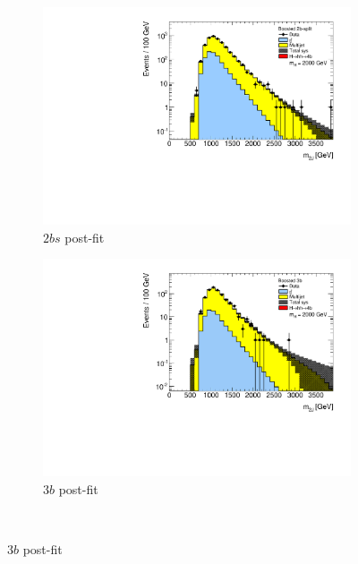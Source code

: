 \begin{figure}[htb!]
\centering
\captionsetup{justification=centering}
    \hspace{-2cm}
    \begin{subfigure}[b]{0.33\textwidth}
        \includegraphics[width=\textwidth,angle=-90]{figures/boosted/results/postfitplot_s_2000_b2b.pdf}
        \caption{$2bs$ post-fit}
        \label{fig:postfit2bs}
    \end{subfigure}
    \quad \quad \quad \quad
    \begin{subfigure}[b]{0.33\textwidth}
        \includegraphics[width=\textwidth,angle=-90]{figures/boosted/results/postfitplot_s_2000_b3b.pdf}
        \caption{$3b$ post-fit}
        \label{fig:postfit3b}
    \end{subfigure}
    \\

\end{figure}
